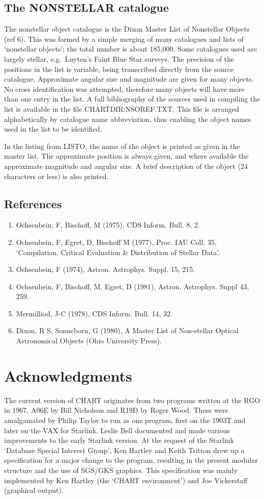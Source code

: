 \subsection{The NONSTELLAR catalogue}
The nonstellar object catalogue is the Dixon Master List of Nonstellar Objects
(ref 6).
This was formed by a simple merging of many catalogues and lists of
`nonstellar objects'; the total number is about 185,000.
Some catalogues used are largely stellar, e.g.\ Luyten's Faint Blue Star
surveys. The precision of the positions in the list is variable, being
transcribed directly from the source catalogue. 
Approximate angular size and magnitude are given for many objects.
No cross identification was attempted, therefore many objects will have more
than one entry in the list.
A full bibliography of the sources used in compiling the list is available in
the file CHARTDIR:NSOREF.TXT.
This file is arranged alphabetically by catalogue name abbreviation, thus
enabling the object names used in the list to be identified.

In the listing from LISTO, the name of the object is printed as given in the
master list.
The approximate position is always given, and where available the approximate
magnitude and angular size.
A brief description of the object (24 characters or less) is also printed.
\subsection{References}
\begin{enumerate}
\item Ochsenbein, F, Bischoff, M (1975), CDS Inform. Bull. 8, 2.
\item Ochsenbein, F, Egret, D, Bischoff M (1977), Proc. IAU Coll. 35,
    `Compilation, Critical Evaluation \& Distribution of Stellar Data'.
\item Ochsenbein, F (1974), Astron. Astrophys. Suppl. 15, 215.
\item Ochsenbein, F, Bischoff, M, Egret, D (1981), Astron. Astrophys.
    Suppl 43, 259.
\item Mermilliod, J-C (1978), CDS Inform. Bull. 14, 32.
\item Dixon, R S, Sonneborn, G (1980),  A Master List of Non-stellar
    Optical Astronomical Objects (Ohio University Press).
\end{enumerate}
\section{Acknowledgments}
The current version of CHART originates from two programs written at the RGO in
1967, A06E by Bill Nicholson and R19D by Roger Wood.
These were amalgamated by Philip Taylor to run as one program, first on the
1903T and later on the VAX for Starlink.
Leslie Bell documented and made various improvements to the early Starlink
version.
At the request of the Starlink `Database Special Interest Group', Ken Hartley
and Keith Tritton drew up a specification for a major change to the program,
resulting in the present modular structure and the use of SGS/GKS graphics.
This specification was mainly implemented by Ken Hartley (the `CHART
environment') and Joe Vickerstaff (graphical output).

